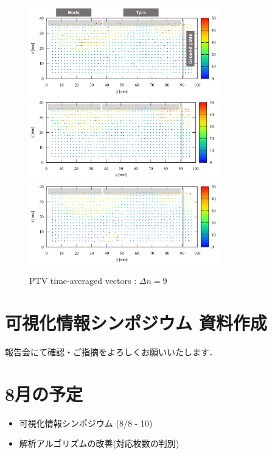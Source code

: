 \documentclass[twocolumn,a4j]{jsarticle}
\begin{document}
\begin{figure}[htbp]
  \footnotesize
  \begin{center}
    \includegraphics[width=82mm]{../images/tyre_+0.png}
    \includegraphics[width=82mm]{../images/tyre_+5.png}
    \includegraphics[width=82mm]{../images/tyre_+10.png}
  \end{center}
  \caption{PTV time-averaged vectors : $\Delta n = 9$}
\end{figure}

\section{可視化情報シンポジウム 資料作成}
報告会にて確認・ご指摘をよろしくお願いいたします．

\section{8月の予定}
\begin{itemize}
  \item 可視化情報シンポジウム (8/8 - 10)
  \item 解析アルゴリズムの改善(対応枚数の判別)
\end{itemize}
\end{document}
